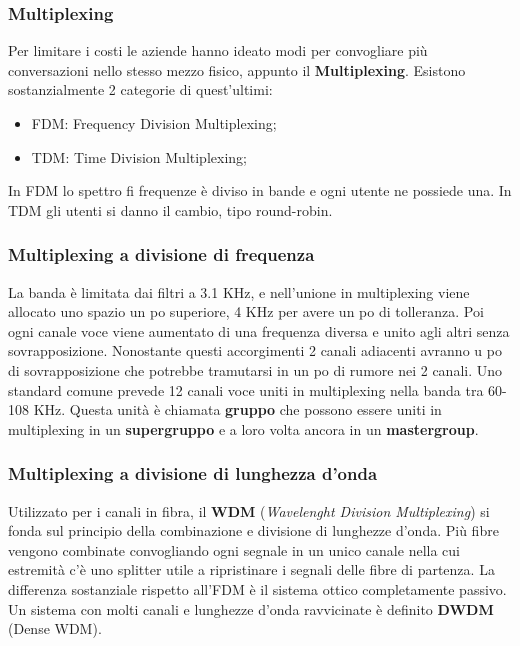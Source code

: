 \subsubsection{Multiplexing}

Per limitare i costi le aziende hanno ideato modi per convogliare più conversazioni nello stesso mezzo fisico, appunto il\textbf{ Multiplexing}. Esistono sostanzialmente 2 categorie di quest'ultimi:

\begin{itemize}

\item{FDM: Frequency Division Multiplexing};
\item{TDM: Time Division Multiplexing};

\end{itemize}

In FDM lo spettro fi frequenze è diviso in bande e ogni utente ne possiede una. In TDM gli utenti si danno il cambio, tipo round-robin.

\subsubsection*{Multiplexing a divisione di frequenza}

La banda è limitata dai filtri a 3.1 KHz, e nell'unione in multiplexing viene allocato uno spazio un po superiore, 4 KHz per avere un po di tolleranza. Poi ogni canale voce viene aumentato di una frequenza diversa e unito agli altri senza sovrapposizione. Nonostante questi accorgimenti 2 canali adiacenti avranno u po di sovrapposizione che potrebbe tramutarsi in un po di rumore nei 2 canali. Uno standard comune prevede 12 canali voce uniti in multiplexing nella banda tra 60-108 KHz. Questa unità è chiamata \textbf{gruppo} che possono essere uniti in multiplexing in un \textbf{supergruppo} e a loro volta ancora in un \textbf{mastergroup}.

\subsubsection*{Multiplexing a divisione di lunghezza d'onda}

Utilizzato per i canali in fibra, il \textbf{WDM} (\textit{Wavelenght Division Multiplexing}) si fonda sul principio della combinazione e divisione di lunghezze d'onda. Più fibre vengono combinate convogliando ogni segnale in un unico canale nella cui estremità c'è uno splitter utile a ripristinare i segnali delle fibre di partenza. La differenza sostanziale rispetto all'FDM è il sistema ottico completamente passivo. Un sistema con molti canali e lunghezze d'onda ravvicinate è definito \textbf{DWDM} (Dense WDM).


